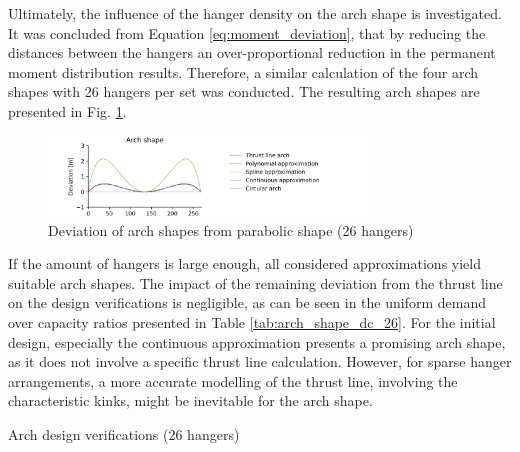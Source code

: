 Ultimately, the influence of the hanger density on the arch shape is investigated. It was concluded from Equation \eqref{eq:moment_deviation}, that by reducing the distances between the hangers an over-proportional reduction in the permanent moment distribution results. Therefore, a similar calculation of the four arch shapes with 26 hangers per set was conducted. The resulting arch shapes are presented in Fig. \ref{fig:arch_shapes_26}.

\begin{figure}[H]
    \centering
    \includegraphics[trim={1cm 0 3cm 0},clip, width=0.76\textwidth]{calculations/arch shape/arch_shapes_26.png}
    \caption{Deviation of arch shapes from parabolic shape (26 hangers)}
    \label{fig:arch_shapes_26}
\end{figure}

If the amount of hangers is large enough, all considered approximations yield suitable arch shapes. The impact of the remaining deviation from the thrust line on the design verifications is negligible, as can be seen in the uniform demand over capacity ratios presented in Table \ref{tab:arch_shape_dc_26}. For the initial design, especially the continuous approximation presents a promising arch shape, as it does not involve a specific thrust line calculation. However, for sparse hanger arrangements, a more accurate modelling of the thrust line, involving the characteristic kinks, might be inevitable for the arch shape.

\begin{table}[H]
    \centering
    
    \caption{Arch design verifications (26 hangers)}
    \label{tab:arch_shape_dc_26}
\end{table}


\newpage
